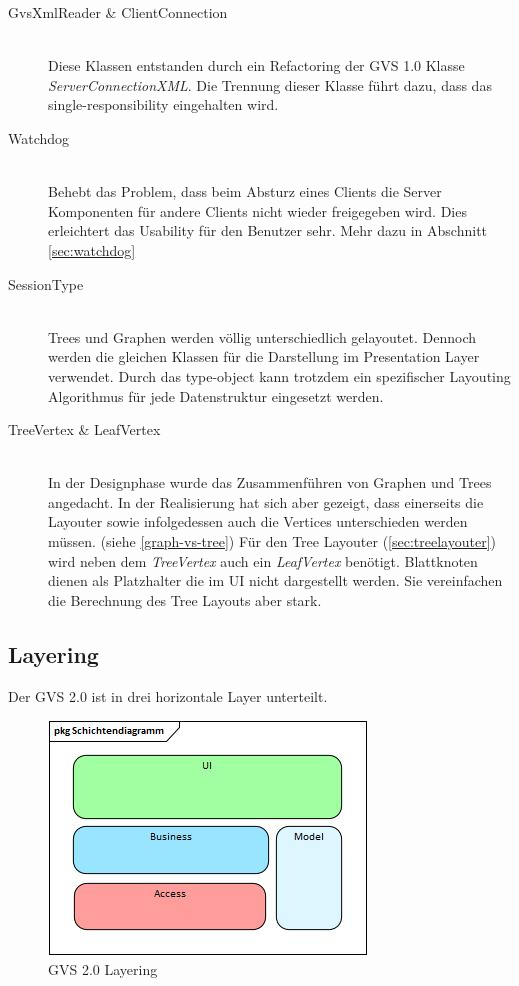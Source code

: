 \documentclass[11pt,a4paper,english,oneside]{book}
\numberwithin{equation}{chapter}
\begin{document}
	\begin{description} \label{desc:architecture-changes}
		\item[GvsXmlReader \& ClientConnection ] \hfill \\ Diese Klassen entstanden durch ein Refactoring der GVS 1.0 Klasse \textit{ServerConnectionXML}. Die Trennung dieser Klasse führt dazu, dass das \gls{single-responsibility} eingehalten wird. 
		\item[Watchdog] \hfill \\ Behebt das Problem, dass beim Absturz eines Clients die Server Komponenten für andere Clients nicht wieder freigegeben wird. Dies erleichtert das Usability für den Benutzer sehr. Mehr dazu in Abschnitt \ref{sec:watchdog}
		\item[SessionType] \hfill \\ Trees und Graphen werden völlig unterschiedlich gelayoutet. Dennoch werden die gleichen Klassen für die Darstellung im Presentation Layer verwendet. Durch das \gls{type-object} kann trotzdem ein spezifischer Layouting Algorithmus für jede Datenstruktur eingesetzt werden.
		\item[TreeVertex \& LeafVertex] \hfill \\ 
		In der Designphase wurde das Zusammenführen von Graphen und Trees angedacht. In der Realisierung hat sich aber gezeigt, dass einerseits die Layouter sowie infolgedessen auch die Vertices unterschieden werden müssen. (siehe \ref{graph-vs-tree}) Für den Tree Layouter (\ref{sec:treelayouter}) wird neben dem \textit{TreeVertex} auch ein \textit{LeafVertex} benötigt.  Blattknoten dienen als Platzhalter die im UI nicht dargestellt werden. Sie vereinfachen die Berechnung des Tree Layouts aber stark.
	\end{description}

	\subsection{Layering} \label{ssec:layering}
	Der GVS 2.0 ist in drei horizontale Layer unterteilt.
	
	\begin{figure}[h!]
		\centering
		\includegraphics[width=0.5\linewidth]{assets/images/layering}
		\caption{GVS 2.0 Layering}
		\label{fig:layering}
	\end{figure}
	
\end{document}
